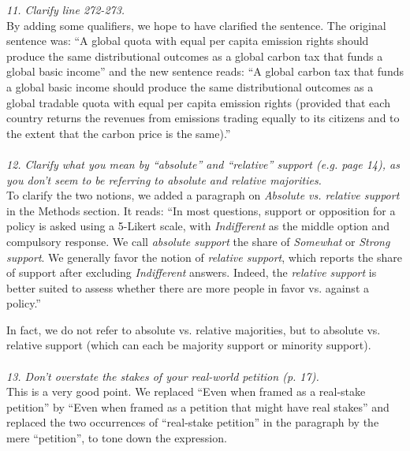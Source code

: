 \documentclass[12pt,english]{article}
\begin{document}
\textit{11. Clarify line 272-273.}~\\

By adding some qualifiers, we hope to have clarified the sentence. The original sentence was: ``A global quota with equal per capita emission rights should produce the same distributional outcomes as a global carbon tax that funds a global basic income'' and the new sentence reads: ``A global carbon tax that funds a global basic income should produce the same distributional outcomes as a global tradable quota with equal per capita emission rights (provided that each country returns the revenues from emissions trading equally to its citizens and to the extent that the carbon price is the same).''
~\\ ~\\

\textit{12. Clarify what you mean by “absolute” and “relative” support (e.g. page 14), as you don’t seem to be referring to absolute and relative majorities.} ~\\ %

To clarify the two notions, we added a paragraph on \textit{Absolute vs. relative support} in the Methods section. It reads: ``In most questions, support or opposition for a policy is asked using a 5-Likert scale, with \textit{Indifferent} as the middle option and compulsory response. We call \textit{absolute support} the share of \textit{Somewhat} or \textit{Strong support}. We generally favor the notion of \textit{relative support}, which reports the share of support after excluding \textit{Indifferent} answers. Indeed, the \textit{relative support} is better suited to assess whether there are more people in favor vs. against a policy.''

In fact, we do not refer to absolute vs. relative majorities, but to absolute vs. relative support (which can each be majority support or minority support).
~\\ ~\\


\textit{13. Don’t overstate the stakes of your real-world petition (p. 17).}~\\

This is a very good point. We replaced ``Even when framed as a real-stake petition'' by ``Even when framed as a petition that might have real stakes'' and replaced the two occurrences of ``real-stake petition'' in the paragraph by the mere ``petition'', to tone down the expression.
~\\ ~\\
\end{document}
